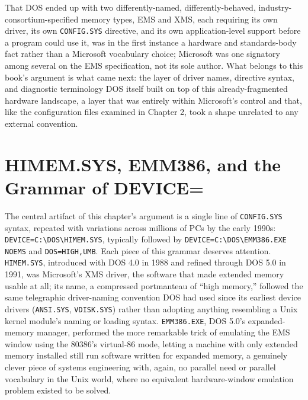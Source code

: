 \documentclass[11pt]{book}
\begin{document}
That DOS ended up with two differently-named, differently-behaved, industry-consortium-specified memory types, EMS and XMS, each requiring its own driver, its own \texttt{CONFIG.SYS} directive, and its own application-level support before a program could use it, was in the first instance a hardware and standards-body fact rather than a Microsoft vocabulary choice; Microsoft was one signatory among several on the EMS specification, not its sole author. What belongs to this book's argument is what came next: the layer of driver names, directive syntax, and diagnostic terminology DOS itself built on top of this already-fragmented hardware landscape, a layer that was entirely within Microsoft's control and that, like the configuration files examined in Chapter 2, took a shape unrelated to any external convention.

\section{HIMEM.SYS, EMM386, and the Grammar of DEVICE=}

The central artifact of this chapter's argument is a single line of \texttt{CONFIG.SYS} syntax, repeated with variations across millions of PCs by the early 1990s: \texttt{DEVICE=C:\textbackslash{}DOS\textbackslash{}HIMEM.SYS}, typically followed by \texttt{DEVICE=C:\textbackslash{}DOS\textbackslash{}EMM386.EXE NOEMS} and \texttt{DOS=HIGH,UMB}. Each piece of this grammar deserves attention. \texttt{HIMEM.SYS}, introduced with DOS 4.0 in 1988 and refined through DOS 5.0 in 1991, was Microsoft's XMS driver, the software that made extended memory usable at all; its name, a compressed portmanteau of ``high memory,'' followed the same telegraphic driver-naming convention DOS had used since its earliest device drivers (\texttt{ANSI.SYS}, \texttt{VDISK.SYS}) rather than adopting anything resembling a Unix kernel module's naming or loading syntax. \texttt{EMM386.EXE}, DOS 5.0's expanded-memory manager, performed the more remarkable trick of emulating the EMS window using the 80386's virtual-86 mode, letting a machine with only extended memory installed still run software written for expanded memory, a genuinely clever piece of systems engineering with, again, no parallel need or parallel vocabulary in the Unix world, where no equivalent hardware-window emulation problem existed to be solved.
\end{document}
